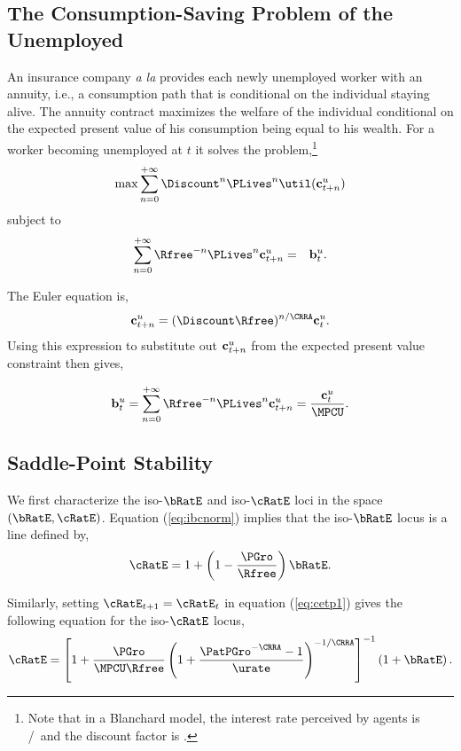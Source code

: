 \documentclass[titlepage]{\econtex}\newcommand{\texname}{cjSOE}
\begin{document}
\subsection{The Consumption-Saving Problem of the Unemployed}

An insurance company {\it a la} \cite{blanchardFinite} provides each
newly unemployed worker with an annuity, i.e., a consumption path that
is conditional on the individual staying alive. The annuity contract
maximizes the welfare of the individual conditional on the expected
present value of his consumption being equal to his wealth. For a
worker becoming unemployed at $t$ it solves the problem,\footnote{Note that in a Blanchard model, the interest rate perceived by agents is \Rfree/\PLives~and the discount factor is \Discount \PLives.}
\begin{equation*}
 \max \sum_{n=0}^{+ \infty} \Discount^{n} \PLives^{n} \util(\cLev^u_{t+n})
\end{equation*}
subject to
\begin{eqnarray*}
\sum_{n=0}^{+ \infty} \Rfree^{-n} \PLives^{n} \cLev^u_{t+n} & = &\bLevU_t.
\end{eqnarray*}

The Euler equation is,
\begin{equation*}
\cLev_{t+n}^u=(\Discount \Rfree)^{n/\CRRA} \cLevU_{t}.
\end{equation*}
Using this expression to substitute out $\mathbf{c}^u_{t+n}$ from the expected present value constraint then gives,

\begin{equation*}
\bLevU_t = \sum_{n=0}^{+\infty} \Rfree^{-n} \PLives^{n} \cLev_{t+n}^u = \frac{\cLevU_{t}}{\MPCU}.
\end{equation*}

\subsection{Saddle-Point Stability}

We first characterize the iso-$\bRatE$ and iso-$\cRatE$ loci in the space $(\bRatE , \cRatE)$. Equation (\ref{eq:ibcnorm}) implies that the iso-$\bRatE$ locus is a line defined by,
\begin{equation*}
\cRatE = 1+\left(1-\frac{\PGro}{\Rfree} \right)\bRatE.
\end{equation*}

Similarly, setting $\cRatE_{t+1} = \cRatE_t$ in equation (\ref{eq:cetp1}) gives the following equation for the iso-$\cRatE$ locus,
\begin{equation*}
\cRatE = \left[1+\frac{\PGro}{\MPCU \Rfree}\left(1+\frac{\PatPGro^{-\CRRA}-1}{\urate}\right)^{-1/\CRRA}\right]^{-1} \left(1+ \bRatE \right).
\end{equation*}
\end{document}
